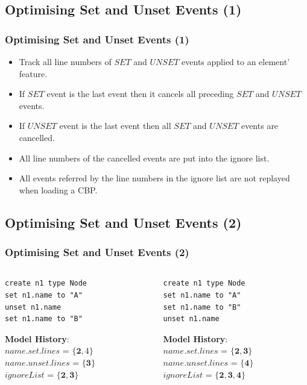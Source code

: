 \documentclass{beamer}
\begin{document}
\begin{frame}
\section{Optimising Set and Unset Events (1)}
\frametitle{Optimising Set and Unset Events (1)}
\begin{itemize}
    \item Track all line numbers of $SET$ and $UNSET$ events applied to an element' feature.
    \item If $SET$ event is the last event then it cancels all preceding $SET$ and $UNSET$ events.
    \item If $UNSET$ event is the last event then all $SET$ and $UNSET$ events are cancelled.
    \item All line numbers of the cancelled events are put into the ignore list. 
    \item All events referred by the line numbers in the ignore list are not replayed when loading a CBP.
\end{itemize}
\end{frame}

\begin{frame}[fragile]
\section{Optimising Set and Unset Events (2)}
\frametitle{Optimising Set and Unset Events (2)}
\begin{columns}
\begin{column}[t]{0.49\linewidth}
\begin{lstlisting}[style=eol,caption={A CBP representation of attribute \emph{name} assignments ended with SET.},label=lst:set_unset_example_1]
create n1 type Node
set n1.name to "A"
unset n1.name
set n1.name to "B"
\end{lstlisting}

\textbf{\footnotesize Model History}:\\
$name$.$set$.$lines$ = $\{\boldsymbol{2},4\}$\\
$name$.$unset$.$lines$ = $\{\boldsymbol{3}\}$\\
$ignoreList$ = $\{\boldsymbol{2}, \boldsymbol{3}\}$

\end{column}
\begin{column}[t]{0.49\linewidth}
\begin{lstlisting}[style=eol,caption={A CBP representation of attribute \emph{name} assignments ended with UNSET.},label=lst:set_unset_example_2]
create n1 type Node
set n1.name to "A"
set n1.name to "B"
unset n1.name
\end{lstlisting}

\textbf{\footnotesize Model History}:\\
$name$.$set$.$lines$ = $\{\boldsymbol{2},\boldsymbol{3}\}$\\ 
$name$.$unset$.$lines$ = $\{\boldsymbol{4}\}$\\
$ignoreList$ = $\{\boldsymbol{2}, \boldsymbol{3}, \boldsymbol{4}\}$

\end{column}
\end{columns}
\end{frame}
\end{document}
